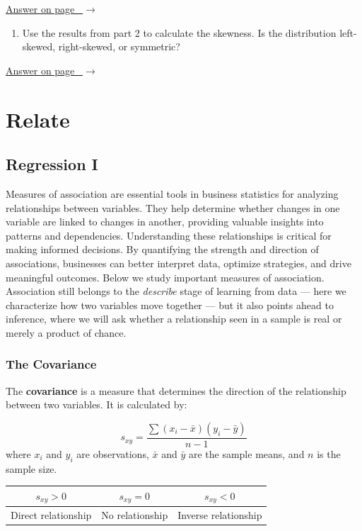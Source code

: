 \documentclass[
  11pt,
  letterpaper,
  DIV=11,
  numbers=noendperiod,
  oneside,
  open=any]{scrreprt}
\providecommand{\tightlist}{%
  \setlength{\itemsep}{0pt}\setlength{\parskip}{0pt}}\usepackage{longtable,booktabs,array}
\newcommand{\bsanswerref}[1]{%
  \par\nopagebreak\hypertarget{q-#1}{}\label{q-#1}%
  {\raggedleft\sffamily\footnotesize\hyperlink{a-#1}{\textcolor{bsaccent}{Answer on page \pageref{a-#1}\ $\rightarrow$}}\par}%
  \medskip}
\begin{document}
\bsanswerref{bsans47}

\begin{enumerate}
\def\labelenumi{\arabic{enumi}.}
\setcounter{enumi}{2}
\tightlist
\item
  Use the results from part 2 to calculate the skewness. Is the
  distribution left-skewed, right-skewed, or symmetric?
\end{enumerate}

\bsanswerref{bsans48}

\part{Relate}

\chapter{Regression I}\label{regression-i}

Measures of association are essential tools in business statistics for
analyzing relationships between variables. They help determine whether
changes in one variable are linked to changes in another, providing
valuable insights into patterns and dependencies. Understanding these
relationships is critical for making informed decisions. By quantifying
the strength and direction of associations, businesses can better
interpret data, optimize strategies, and drive meaningful outcomes.
Below we study important measures of association. Association still
belongs to the \emph{describe} stage of learning from data --- here we
characterize how two variables move together --- but it also points
ahead to inference, where we will ask whether a relationship seen in a
sample is real or merely a product of chance.

\section{The Covariance}\label{the-covariance}

The \textbf{covariance} is a measure that determines the direction of
the relationship between two variables. It is calculated by:

\begin{bsformula}

\[s_{xy}=\frac{\sum(x_i-\bar{x})(y_i-\bar{y})}{n-1}\] where \(x_i\) and
\(y_i\) are observations, \(\bar{x}\) and \(\bar{y}\) are the sample
means, and \(n\) is the sample size.

\begin{center}
\begin{tabular}{ccc}
\toprule
\(s_{xy} > 0\) & \(s_{xy} = 0\) & \(s_{xy} < 0\) \\
\midrule
Direct relationship & No relationship & Inverse relationship \\
\bottomrule
\end{tabular}
\end{center}

\end{bsformula}
\end{document}

